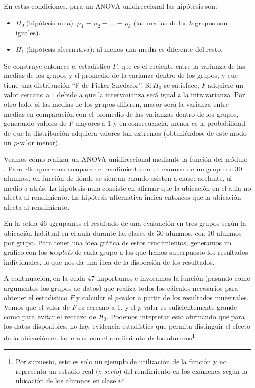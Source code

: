 En estas condiciones, para un ANOVA unidireccional las hipótesis son:
\begin{itemize}
 \item $H_0$ (hipótesis nula): $\mu_1 = \mu_2 = \ldots = \mu_k$ (las medias de los $k$ grupos son iguales).
 \item $H_1$ (hipótesis alternativa): al menos una media es diferente del resto.
\end{itemize}

Se construye entonces el estadístico $F$, que es el cociente entre la varianza de las medias de los grupos y el promedio de la varianza dentro de los grupos, y que tiene una distribución ``F de Fisher-Snedecor''. Si $H_0$ se satisface, $F$ adquiere un valor cercano a $1$ debido a que la intervarianza será igual a la intravarianza. Por otro lado, si las medias de los grupos difieren, mayor será la varianza entre medias en comparación con el promedio de las varianzas dentro de los grupos, generando valores de $F$ mayores a $1$ y en consecuencia, menor es la probabilidad de que la distribución adquiera valores tan extremos (obteniéndose de este modo un $p$-valor menor). 

Veamos cómo realizar un ANOVA unidireccional mediante la función  del módulo . Para ello queremos comparar el rendimiento en un examen de un grupo de 30 alumnos, en función de dónde se sientan cuando asisten a clase: adelante, al medio o atrás. La hipótesis nula consiste en afirmar que la ubicación en el aula no afecta al rendimiento. La hipótesis alternativa indica entonces que la ubicación afecta al rendimiento. 

En la celda 46 agrupamos el resultado de una evaluación en tres grupos según la ubicación habitual en el aula durante las clases de 30 alumnos, con 10 alumnos por grupo. Para tener una idea gráfica de estos rendimientos, generamos un gráfico con los \textit{boxplots} de cada grupo a los que hemos superpuesto los resultados individuales, lo que nos da una idea de la dispersión de los resultados.

A continuación, en la celda 47 importamos e invocamos la función  (pasando como argumentos los grupos de datos) que realiza todos los cálculos necesarios para obtener el estadístico $F$ y calcular el $p$-valor a partir de los resultados muestrales. Vemos que el valor de $F$ es cercano a $1$, y el $p$-valor es suficientemente grande como para evitar el rechazo de $H_0$. Podemos intepretar esto afirmando que para los datos disponibles, no hay evidencia estadística que permita distinguir el efecto de la ubicación en las clases con el rendimiento de los alumnos\footnote{Por supuesto, esto es solo un ejemplo de utilización de la función  y no representa un estudio real (y \textit{serio}) del rendimiento en los exámenes según la ubicación de los alumnos en clase.}. 

